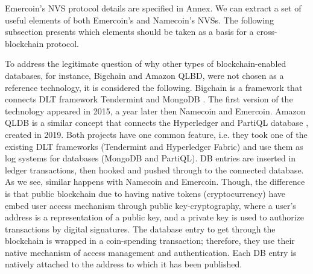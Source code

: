 \begin{multicols}{2}
Emercoin’s NVS protocol details are specified in Annex. We can extract a set of useful elements of both Emercoin’s and Namecoin’s NVSs. The following subsection presents which elements should be taken as a basis for a cross-blockchain protocol.

To address the legitimate question of why other types of blockchain-enabled databases, for instance, Bigchain and Amazon QLBD, were not chosen as a reference technology, it is considered the following. Bigchain is a framework that connects DLT framework Tendermint and MongoDB \cite{art1-key25}. The first version of the technology appeared in 2015, a year later then Namecoin and Emercoin. Amazon QLDB is a similar concept that connects the Hyperledger and PartiQL database \cite{art1-key26}, created in 2019. Both projects have one common feature, i.e. they took one of the existing DLT frameworks (Tendermint and Hyperledger Fabric) and use them as log systems for databases (MongoDB and PartiQL). DB entries are inserted in ledger transactions, then hooked and pushed through to the connected database. As we see, similar happens with Namecoin and Emercoin. Though, the difference is that public blockchain due to having native tokens (cryptocurrency) have embed user access mechanism through public key-cryptography, where a user’s address is a representation of a public key, and a private key is used to authorize transactions by digital signatures. The database entry to get through the blockchain is wrapped in a coin-spending transaction; therefore, they use their native mechanism of access management and authentication. Each DB entry is natively attached to the address to which it has been published.


\end{multicols}
